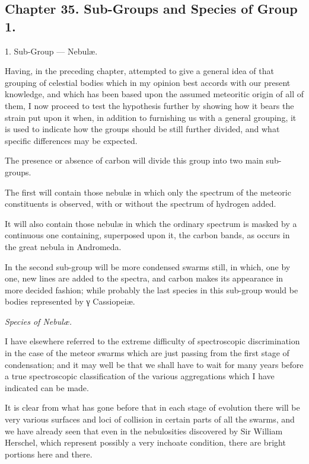 \documentclass[a4paper, 12pt, oneside, polutonikogreek, english]{article}
\begin{document}
\subsection{Chapter 35. Sub-Groups and Species of Group 1.}

1. Sub-Group --- Nebulæ.

Having, in the preceding chapter, attempted to give a general idea of that grouping of celestial bodies which in my opinion best accords with our present knowledge, and which has been based upon the assumed meteoritic origin of all of them, I now proceed to test the hypothesis further by showing how it bears the strain put upon it when, in addition to furnishing us with a general grouping, it is used to indicate how the groups should be still further divided, and what specific differences may be expected.

The presence or absence of carbon will divide this group into two main sub-groups.

The first will contain those nebulæ in which only the spectrum of the meteoric constituents is observed, with or without the spectrum of hydrogen added.

It will also contain those nebulæ in which the ordinary spectrum is masked by a continuous one containing, superposed upon it, the carbon bands, as occurs in the great nebula in Andromeda.

In the second sub-group will be more condensed swarms still, in which, one by one, new lines are added to the spectra, and carbon makes its appearance in more decided fashion; while probably the last species in this sub-group would be bodies represented by γ Cassiopeiæ.

\emph{Species of Nebulæ.}

I have elsewhere referred to the extreme difficulty of spectroscopic discrimination in the case of the meteor swarms which are just passing from the first stage of condensation; and it may well be that we shall have to wait for many years before a true spectroscopic classification of the various aggregations which I have indicated can be made.

It is clear from what has gone before that in each stage of evolution there will be very various surfaces and loci of collision in certain parts of all the swarms, and we have already seen that even in the nebulosities discovered by Sir William Herschel, which represent possibly a very inchoate condition, there are bright portions here and there.
\end{document}
